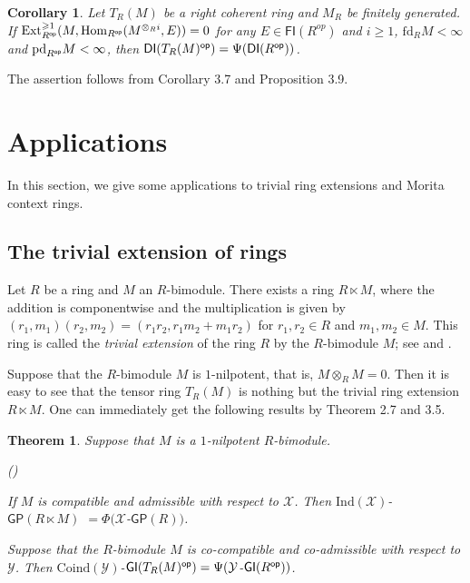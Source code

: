 \documentclass[10pt,twoside]{amsart}
\theoremstyle{bfupright head,slanted body}
\theoremstyle{bfupright head,upright body}
\theoremstyle{fixed bf head,slanted body}
\newtheorem{thm}[res]{Theorem}          \newtheorem*{thm*}{Theorem}
\newtheorem{cor}[res]{Corollary}        \newtheorem*{cor*}{Corollary}
\theoremstyle{fixed bf head,upright body}
\theoremstyle{numbered paragraph}
\newlength{\thmlistleft}        %
\newlength{\thmlistright}       %
\newlength{\thmlistpartopsep}   %
\newlength{\thmlisttopsep}      %
\newlength{\thmlistparsep}      %
\newlength{\thmlistitemsep}     %
\newcounter{rqm}
\newenvironment{rqm}{\begin{list}{\upshape (\arabic{rqm})}%
    {\usecounter{rqm}%
      \setlength{\leftmargin}{\thmlistleft}%
      \setlength{\labelwidth}{\thmlistleft}%
      \setlength{\rightmargin}{\thmlistright}%
      \setlength{\partopsep}{\thmlistpartopsep}%
      \setlength{\topsep}{\thmlisttopsep}%
      \setlength{\parsep}{\thmlistparsep}%
      \setlength{\itemsep}{\thmlistitemsep}}}%
  {\end{list}}%
\newenvironment{prf*}[1][Proof]{%
  \begin{proof}[\bf #1]
    \setcounter{equation}{0}
    \renewcommand{\theequation}{\arabic{equation}}}
  {\end{proof}
  }
\numberwithin{equation}{res}
\newcommand{\GP}{\mathsf{GP}}
\newcommand{\DI}{\mathsf{DI}}
\newcommand{\GI}{\mathsf{GI}}
\newcommand{\fd}{\mathrm{fd}}
\newcommand{\pd}{\mathrm{pd}}
\newcommand{\FI}{\mathsf{FI}}
\newcommand{\Coind}{\mathrm{Coind}}
\newcommand{\Ind}{\mathrm{Ind}}
\newcommand{\Rop}{R^{\sf op}}
\newcommand{\op}{\sf op}
\newcommand{\Hom}{\operatorname{Hom}}
\newcommand{\Ext}{\operatorname{Ext}}
\begin{document}
\begin{cor} 
Let $T_R(M)$ be a right coherent ring and $M_{R}$ be finitely generated.
If $\Ext_{\Rop}^{\geqslant 1}(M, \Hom_{\Rop}(M^{\otimes_Ri}, E))=0$ for any $E\in\FI(R^{op})$ and $i\geqslant 1$,
$\fd_{R}M<\infty$and $\pd_{\Rop}M<\infty$,
then $\DI(T_R(M)^{\op}) = \Psi(\DI(\Rop))$.
\end{cor} 

\begin{prf*}
The assertion follows from Corollary 3.7 and Proposition 3.9.
\end{prf*}







\section{Applications}
\label{Applications}%
\noindent
In this section, we give some applications to
trivial ring extensions and Morita context rings.

\subsection{The trivial extension of rings}
\label{The trivial extension of rings}%
\noindent
Let $R$ be a ring and $M$ an $R$-bimodule.
There exists a ring $R\ltimes M$,
where the addition is componentwise
and the multiplication is given by
$(r_1, m_1)(r_2, m_2) = (r_1r_2,r_1m_2 + m_1r_2)$ for $r_1, r_2 \in R$ and $m_1, m_2 \in M$.
This ring is called the \emph{trivial extension} of
the ring $R$ by the $R$-bimodule $M$; see \cite{TRIEXT1975} and \cite{TRIEXT1971}.

Suppose that the $R$-bimodule $M$ is $1$-nilpotent,
that is, $M\otimes_RM=0$.
Then it is easy to see that the tensor ring $T_R(M)$
is nothing but the trivial ring extension $R\ltimes M$.
One can immediately get the following results by
Theorem 2.7 and 3.5.

\begin{thm}\label{THM GP com}
Suppose that $M$ is a $1$-nilpotent $R$-bimodule.
\begin{rqm}
\item
If $M$ is compatible and admissible with respect to $\mathcal{X}$.
Then $\Ind(\mathcal{X})$-$\GP(R\ltimes M)$ $= \Phi(\mathcal{X}$-$\GP(R))$.
\item
Suppose that the $R$-bimodule $M$ is co-compatible and co-admissible with respect to $\mathcal{Y}$.
Then $\Coind(\mathcal{Y})$-$\GI(T_R(M)^{\op}) = \Psi(\mathcal{Y}$-$\GI(\Rop))$.
\end{rqm}
\end{thm}
\end{document}

